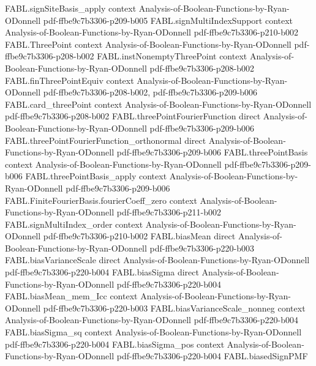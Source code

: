 \begin{theorem}
\proofstep
  {FABL.signSiteBasis_apply}
  {context}
  {Analysis-of-Boolean-Functions-by-Ryan-ODonnell}
  {pdf-ffbe9c7b3306-p209-b005}
\proofstep
  {FABL.signMultiIndexSupport}
  {context}
  {Analysis-of-Boolean-Functions-by-Ryan-ODonnell}
  {pdf-ffbe9c7b3306-p210-b002}
\proofstep
  {FABL.ThreePoint}
  {context}
  {Analysis-of-Boolean-Functions-by-Ryan-ODonnell}
  {pdf-ffbe9c7b3306-p208-b002}
\proofstep
  {FABL.instNonemptyThreePoint}
  {context}
  {Analysis-of-Boolean-Functions-by-Ryan-ODonnell}
  {pdf-ffbe9c7b3306-p208-b002}
\proofstep
  {FABL.finThreePointEquiv}
  {context}
  {Analysis-of-Boolean-Functions-by-Ryan-ODonnell}
  {pdf-ffbe9c7b3306-p208-b002,
    pdf-ffbe9c7b3306-p209-b006}
\proofstep
  {FABL.card_threePoint}
  {context}
  {Analysis-of-Boolean-Functions-by-Ryan-ODonnell}
  {pdf-ffbe9c7b3306-p208-b002}
\proofstep
  {FABL.threePointFourierFunction}
  {direct}
  {Analysis-of-Boolean-Functions-by-Ryan-ODonnell}
  {pdf-ffbe9c7b3306-p209-b006}
\proofstep
  {FABL.threePointFourierFunction_orthonormal}
  {direct}
  {Analysis-of-Boolean-Functions-by-Ryan-ODonnell}
  {pdf-ffbe9c7b3306-p209-b006}
\proofstep
  {FABL.threePointBasis}
  {context}
  {Analysis-of-Boolean-Functions-by-Ryan-ODonnell}
  {pdf-ffbe9c7b3306-p209-b006}
\proofstep
  {FABL.threePointBasis_apply}
  {context}
  {Analysis-of-Boolean-Functions-by-Ryan-ODonnell}
  {pdf-ffbe9c7b3306-p209-b006}
\proofstep
  {FABL.FiniteFourierBasis.fourierCoeff_zero}
  {context}
  {Analysis-of-Boolean-Functions-by-Ryan-ODonnell}
  {pdf-ffbe9c7b3306-p211-b002}
\proofstep
  {FABL.signMultiIndex_order}
  {context}
  {Analysis-of-Boolean-Functions-by-Ryan-ODonnell}
  {pdf-ffbe9c7b3306-p210-b002}
\proofstep
  {FABL.biasMean}
  {direct}
  {Analysis-of-Boolean-Functions-by-Ryan-ODonnell}
  {pdf-ffbe9c7b3306-p220-b003}
\proofstep
  {FABL.biasVarianceScale}
  {direct}
  {Analysis-of-Boolean-Functions-by-Ryan-ODonnell}
  {pdf-ffbe9c7b3306-p220-b004}
\proofstep
  {FABL.biasSigma}
  {direct}
  {Analysis-of-Boolean-Functions-by-Ryan-ODonnell}
  {pdf-ffbe9c7b3306-p220-b004}
\proofstep
  {FABL.biasMean_mem_Icc}
  {context}
  {Analysis-of-Boolean-Functions-by-Ryan-ODonnell}
  {pdf-ffbe9c7b3306-p220-b003}
\proofstep
  {FABL.biasVarianceScale_nonneg}
  {context}
  {Analysis-of-Boolean-Functions-by-Ryan-ODonnell}
  {pdf-ffbe9c7b3306-p220-b004}
\proofstep
  {FABL.biasSigma_sq}
  {context}
  {Analysis-of-Boolean-Functions-by-Ryan-ODonnell}
  {pdf-ffbe9c7b3306-p220-b004}
\proofstep
  {FABL.biasSigma_pos}
  {context}
  {Analysis-of-Boolean-Functions-by-Ryan-ODonnell}
  {pdf-ffbe9c7b3306-p220-b004}
\proofstep
  {FABL.biasedSignPMF}

\end{theorem}
